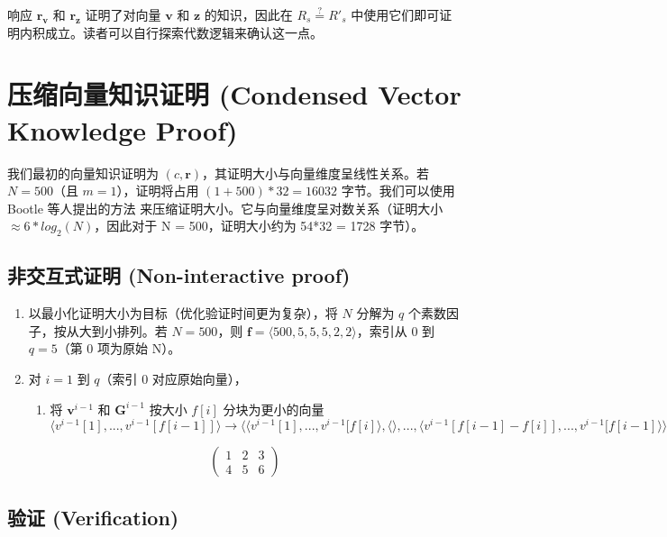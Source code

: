 响应 $\boldsymbol{r_v}$ 和 $\boldsymbol{r_z}$ 证明了对向量 $\boldsymbol{v}$ 和 $\boldsymbol{z}$ 的知识，因此在 $R_s \stackrel{?}{=} R'_s$ 中使用它们即可证明内积成立。读者可以自行探索代数逻辑来确认这一点。


\section{压缩向量知识证明 (Condensed Vector Knowledge Proof)}
\label{sec:condensedvectorproof}

我们最初的向量知识证明为 $(c, \boldsymbol{r})$，其证明大小与向量维度呈线性关系。若 $N = 500$（且 $m = 1$），证明将占用 $(1 + 500)*32 = 16032$ 字节。我们可以使用 Bootle 等人提出的方法 \cite{bootle-efficient-zkcircuits} 来压缩证明大小。它与向量维度呈对数关系（证明大小 $\approx 6*log_2(N)$，因此对于 N = 500，证明大小约为 54*32 = 1728 字节）。


\subsection*{非交互式证明 (Non-interactive proof)}

\begin{enumerate}
    \item 以最小化证明大小为目标（优化验证时间更为复杂），将 $N$ 分解为 $q$ 个素数因子，按从大到小排列。若 $N = 500$，则 $\boldsymbol{f} = \langle 500, 5, 5, 5, 2, 2 \rangle$，索引从 $0$ 到 $q = 5$（第 0 项为原始 N）。
    \item 对 $i = 1$ 到 $q$（索引 0 对应原始向量），
    \begin{enumerate}
        \item 将 $\boldsymbol{v}^{i-1}$ 和 $\boldsymbol{G}^{i-1}$ 按大小 $f[i]$ 分块为更小的向量
        \[ \langle v^{i-1}[1], ..., v^{i-1}[f[i-1]] \rangle \xrightarrow{} \langle \langle v^{i-1}[1],...,v^{i-1}[f[i] \rangle,\langle \rangle,...,\langle v^{i-1}[f[i-1] - f[i] ],..., v^{i-1}[f[i-1]\rangle \rangle \]
    \end{enumerate}
    \[\begin{pmatrix}
        1 & 2 & 3 \\
        4 & 5 & 6
    \end{pmatrix}\]
\end{enumerate}


\subsection*{验证 (Verification)}
